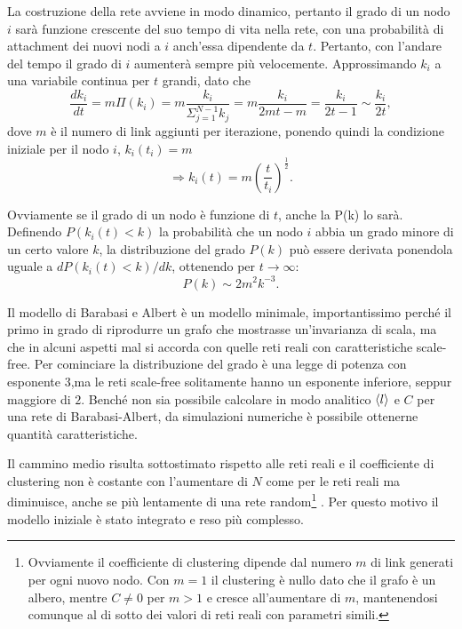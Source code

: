 La costruzione della rete avviene in modo dinamico, pertanto il grado di un nodo $i$ sarà funzione crescente del suo tempo di vita nella rete, con una probabilità di attachment dei nuovi nodi a $i$ anch'essa dipendente da $t$. Pertanto, con l'andare del tempo il grado di $i$ aumenterà sempre più velocemente. Approssimando $k_i$ a una variabile continua per $t$ grandi, dato che 
\[\frac{dk_i}{dt} = m \Pi (k_i) = m \frac{k_i}{\Sigma_{j=1}^{N-1} k_j} = m \frac{k_i}{2mt - m} = \frac{k_i}{2t - 1} \sim \frac{k_i}{2t},\]
dove $m$ è il numero di link aggiunti per iterazione, ponendo quindi la condizione iniziale per il nodo $i$, $k_i(t_i) = m$
\[ \Rightarrow k_i(t) = m (\frac{t}{t_i})^\frac{1}{2}. \]

Ovviamente se il grado di un nodo è funzione di $t$, anche la P(k) lo sarà. Definendo $P(k_i(t)<k)$ la probabilità che un nodo $i$ abbia un grado minore di un certo valore $k$, la distribuzione del grado $P(k)$ può essere derivata ponendola uguale a $dP(k_i(t)<k)/dk$, ottenendo per $t\rightarrow \infty$:
\[ P(k)\sim 2m^2 k^{-3}. \]


Il modello di Barabasi e Albert è un modello minimale, importantissimo perché il primo in grado di riprodurre un grafo che mostrasse un'invarianza di scala, ma che in alcuni aspetti mal si accorda con quelle reti reali con caratteristiche scale-free. Per cominciare la distribuzione del grado è una legge di potenza con esponente $3$,ma le reti scale-free solitamente hanno un esponente inferiore, seppur maggiore di $2$. Benché non sia possibile calcolare in modo analitico $\braket{l}$ e $C$ per una rete di Barabasi-Albert, da simulazioni numeriche è possibile ottenerne quantità caratteristiche. 

Il cammino medio risulta sottostimato rispetto alle reti reali e il coefficiente di clustering non è costante con l'aumentare di $N$ come per le reti reali ma diminuisce, anche se più lentamente di una rete random\footnote{Ovviamente il coefficiente di clustering dipende dal numero $m$ di link generati per ogni nuovo nodo. Con $m = 1$ il clustering \`e nullo dato che il grafo \`e un albero, mentre $C \neq 0$ per $m>1$ e cresce all'aumentare di $m$, mantenendosi comunque al di sotto dei valori di reti reali con parametri simili.} \parencite{Barbalbert2002}. Per questo motivo il modello iniziale è stato integrato e reso più complesso.  


